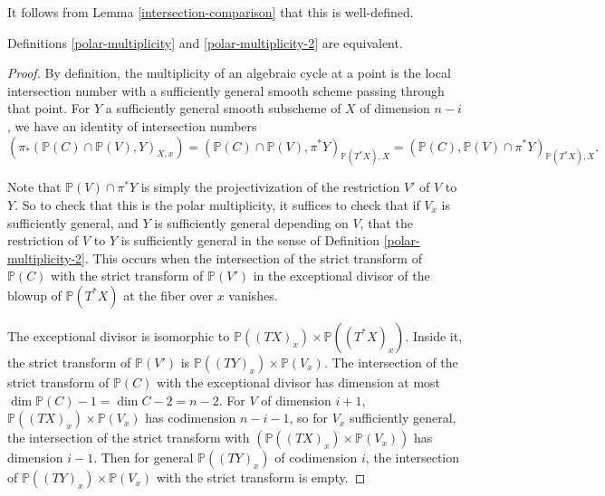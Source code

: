 It follows from Lemma \ref{intersection-comparison} that this is well-defined.




\begin{lemma}
\notready\label{multiplicity-polar} Definitions \ref{polar-multiplicity} and \ref{polar-multiplicity-2} are equivalent.
 \end{lemma}

\begin{proof} By definition, the multiplicity of an algebraic cycle at a point is the local intersection number with a sufficiently general smooth scheme passing through that point. For $Y$ a sufficiently general smooth subscheme of $X$ of dimension $n-i$, we have an identity of intersection numbers \[ (\pi_* ( \mathbb P(C) \cap \mathbb P(V) , Y)_{X,x}) = (\mathbb P(C) \cap \mathbb P(V), \pi^* Y)_{\mathbb P(T^*X), X} =  (\mathbb P(C), \mathbb P(V) \cap \pi^* Y)_{\mathbb P(T^*X), X} .\]

Note that $\mathbb P(V) \cap \pi^* Y$ is simply the projectivization of the restriction $V'$ of $V$ to $Y$. So to check that this is the polar multiplicity, it suffices to check that if $V_x$ is sufficiently general, and $Y$ is sufficiently general depending on $V$, that the restriction of $V$ to $Y$ is sufficiently general in the sense of Definition \ref{polar-multiplicity-2}. This occurs when the intersection of the strict transform of $\mathbb P(C)$ with the strict transform of $\mathbb P(V')$ in the exceptional divisor of the blowup of $\mathbb P (T^* X)$ at the fiber over $x$ vanishes.

The exceptional divisor is isomorphic to $\mathbb P ( (TX)_x ) \times \mathbb P( (T^*X)_x) $. Inside it, the strict transform of $\mathbb P(V')$ is $\mathbb P ( (TY)_x) \times \mathbb P (  V_x)$. The intersection of the strict transform of $\mathbb P(C)$ with the exceptional divisor has dimension at most $\dim \mathbb P(C) -1 =\dim C-2= n-2$. For $V$ of dimension $i+1$, $\mathbb P( (TX)_x) \times \mathbb P( V_x)$ has codimension $n-i-1$, so for $V_x$ sufficiently general,  the intersection of the strict transform with $( \mathbb P( (TX)_x) \times \mathbb P( V_x))$ has dimension $i-1$. Then for general $\mathbb P( (TY)_x)$ of codimension $i$, the intersection of $\mathbb P ( (TY)_x) \times \mathbb P (  V_x)$ with the strict transform is empty.
\end{proof}
